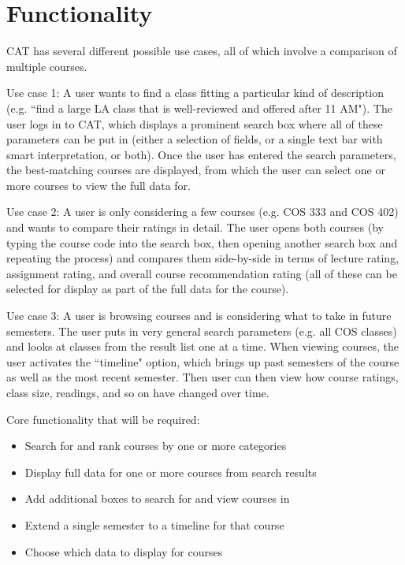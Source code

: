 \documentclass[11pt]{article}
\begin{document}
\section{Functionality}
CAT has several different possible use cases, all of which involve a comparison of multiple courses.
\par Use case 1: A user wants to find a class fitting a particular kind of description (e.g. ``find a large LA class that is well-reviewed and offered after 11 AM"). The user logs in to CAT, which displays a prominent search box where all of these parameters can be put in (either a selection of fields, or a single text bar with smart interpretation, or both). Once the user has entered the search parameters, the best-matching courses are displayed, from which the user can select one or more courses to view the full data for.
\par Use case 2: A user is only considering a few courses (e.g. COS 333 and COS 402) and wants to compare their ratings in detail. The user opens both courses (by typing the course code into the search box, then opening another search box and repeating the process) and compares them side-by-side in terms of lecture rating, assignment rating, and overall course recommendation rating (all of these can be selected for display as part of the full data for the course).
\par Use case 3: A user is browsing courses and is considering what to take in future semesters. The user puts in very general search parameters (e.g. all COS classes) and looks at classes from the result list one at a time. When viewing courses, the user activates the ``timeline" option, which brings up past semesters of the course as well as the most recent semester. Then user can then view how course ratings, class size, readings, and so on have changed over time.

\par Core functionality that will be required:
\begin{itemize}
\item Search for and rank courses by one or more categories
\item Display full data for one or more courses from search results
\item Add additional boxes to search for and view courses in
\item Extend a single semester to a timeline for that course
\item Choose which data to display for courses
\end{itemize}
\end{document}

